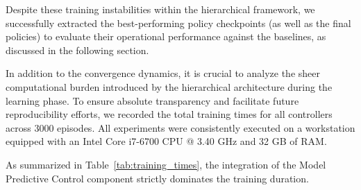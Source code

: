 Despite these training instabilities within the hierarchical framework, we successfully extracted the best-performing policy checkpoints (as well as the final policies) to evaluate their operational performance against the baselines, as discussed in the following section.

In addition to the convergence dynamics, it is crucial to analyze the sheer computational burden introduced by the hierarchical architecture during the learning phase. To ensure absolute transparency and facilitate future reproducibility efforts, we recorded the total training times for all controllers across 3000 episodes. All experiments were consistently executed on a workstation equipped with an Intel Core i7-6700 CPU @ 3.40 GHz and 32 GB of RAM.

As summarized in Table~\ref{tab:training_times}, the integration of the Model Predictive Control component strictly dominates the training duration. 

\begin{table}[htbp]
\centering
\caption{Total training time required for 3000 episodes across 6 different demand profiles, and noise levels (format: hh:mm:ss). Experiments were conducted on an Intel Core i7-6700 CPU (3.40 GHz) with 32 GB RAM.}
\label{tab:training_times}
\end{table}

